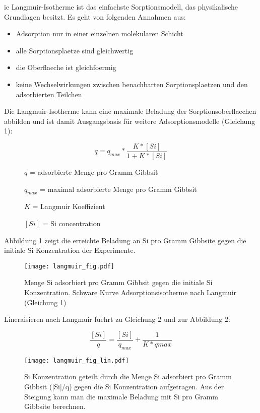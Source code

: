 ie Langmuir-Isotherme ist das einfachste Sorptionsmodell, das physikalische Grundlagen besitzt. 
Es geht von folgenden Annahmen aus:

\begin{itemize}
\item Adsorption nur in einer einzelnen molekularen Schicht
\item alle Sorptionsplaetze sind gleichwertig
\item die Oberflaeche ist gleichfoermig 
\item keine Wechselwirkungen zwischen benachbarten Sorptionsplaetzen und den adsorbierten Teilchen
\end{itemize}

Die Langmuir-Isotherme kann eine maximale Beladung der Sorptionsoberflaechen abbilden und ist damit Ausgangsbasis für weitere Adsorptionsmodelle (Gleichung 1):

\begin{equation}
q=q_{max}*\frac{K*[Si]}{1+K*[Si]}
\end{equation}

\begin{description}
\item[ ] $q$ = adsorbierte Menge pro Gramm Gibbsit
\item[ ] $q_{max}$ = maximal adsorbierte Menge pro Gramm Gibbsit
\item[ ]$K$ = Langmuir Koeffizient	
\item[ ]$[Si]$ = Si concentration
\end{description}

\bigskip

Abbildung 1 zeigt die erreichte Beladung an Si pro Gramm Gibbsite gegen die initiale Si Konzentration der Experimente.
\begin{figure}[htbp]
\begin{center}
\texttt{[image: langmuir\_fig.pdf]}
\caption{Menge Si adsorbiert pro Gramm Gibbsit gegen die initiale Si Konzentration. Schware Kurve Adsorptionsisotherme nach Langmuir (Gleichung 1)}
\label{default}
\end{center}
\end{figure}


Lineraisieren nach Langmuir fuehrt zu Gleichung 2 und zur Abbildung 2:

\begin{equation}
\frac{[Si]}{q}=\frac{[Si]}{q_{max}}+\frac{1}{K*q{max}}
\end{equation}

\begin{figure}[htbp]
\begin{center}
\texttt{[image: langmuir\_fig\_lin.pdf]}
\caption{Si Konzentration geteilt durch die Menge Si adsorbiert pro Gramm Gibbsit ([Si]/q) gegen die Si Konzentration aufgetragen. Aus der Steigung kann man die maximale Beladung mit Si pro Gramm Gibbsite berechnen. }
\label{default}
\end{center}
\end{figure}


